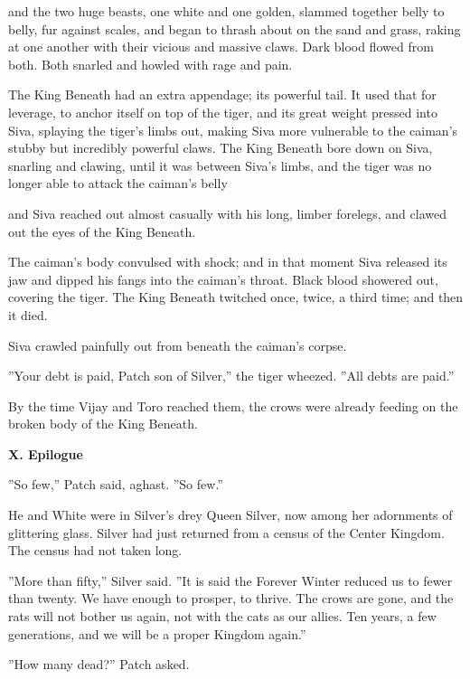 \documentclass[11pt]{article}
\begin{document}
 and the two huge beasts, one white and one golden, slammed together belly to belly, fur against scales, and began to thrash about on the sand and grass, raking at one another with their vicious and massive claws. Dark blood flowed from both. Both snarled and howled with rage and pain.\par
The King Beneath had an extra appendage; its powerful tail. It used that for leverage, to anchor itself on top of the tiger, and its great weight pressed into Siva, splaying the tiger's limbs out, making Siva more vulnerable to the caiman's stubby but incredibly powerful claws. The King Beneath bore down on Siva, snarling and clawing, until it was between Siva's limbs, and the tiger was no longer able to attack the caiman's belly %
\par
 and Siva reached out almost casually with his long, limber forelegs, and clawed out the eyes of the King Beneath.\par
The caiman's body convulsed with shock; and in that moment Siva released its jaw and dipped his fangs into the caiman's throat. Black blood showered out, covering the tiger. The King Beneath twitched once, twice, a third time; and then it died.\par
Siva crawled painfully out from beneath the caiman's corpse.\par
''Your debt is paid, Patch son of Silver,'' the tiger wheezed. ''All debts are paid.''\par
By the time Vijay and Toro reached them, the crows were already feeding on the broken body of the King Beneath.\par
\pagebreak \par
{\bf X. Epilogue\par

}\par
 ''So few,'' Patch said, aghast. ''So few.''\par
 He and White were in Silver's drey %
 Queen Silver, now %
 among her adornments of glittering glass. Silver had just returned from a census of the Center Kingdom. The census had not taken long.\par
 ''More than fifty,'' Silver said. ''It is said the Forever Winter reduced us to fewer than twenty. We have enough to prosper, to thrive. The crows are gone, and the rats will not bother us again, not with the cats as our allies. Ten years, a few generations, and we will be a proper Kingdom again.''\par
 ''How many dead?'' Patch asked.\par
\end{document}
